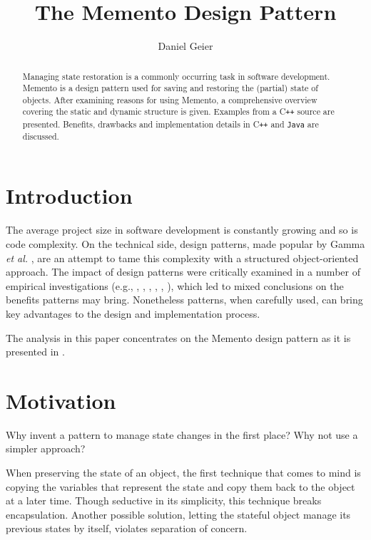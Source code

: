 \documentclass[11pt, a4paper, twoside]{article}
\title{The Memento Design Pattern}
\author{Daniel Geier}
\date{} %
\def\cpp{C{}\texttt{++}}
\begin{document}
	\maketitle

	\begin{abstract} \noindent
 		Managing state restoration is a commonly occurring task in software development. Memento is a design pattern used for saving and restoring the (partial) state of objects. After examining reasons for using Memento, a comprehensive overview covering the static and dynamic structure is given. Examples from a \cpp{} source are presented. Benefits, drawbacks and implementation details in \cpp{} and \verb|Java| are discussed.
	\end{abstract}
	
	\section{Introduction}
	\label{sec:intro}
	The average project size in software development is constantly growing and so is code complexity. On the technical side, design patterns, made popular by Gamma \textit{et al.} \cite{gamma1993design}, are an attempt to tame this complexity with a structured object-oriented approach. The impact of design patterns were critically examined in a number of empirical investigations (e.g., \cite{jeanmart2009impact}, \cite{khomh2008design}, \cite{di2008empirical}, \cite{prechelt2001controlled}, \cite{vokac2004defect}, \cite{vokavc2004controlled}), which led to mixed conclusions on the benefits patterns may bring. Nonetheless patterns, when carefully used, can bring key advantages to the design and implementation process.
	
	The analysis in this paper concentrates on the Memento design pattern as it is presented in \cite{gamma1994design}.
	
	\section{Motivation}
	\label{sec:motivation}
	 Why invent a pattern to manage state changes in the first place? Why not use a simpler approach?
	 
	 When preserving the state of an object, the first technique that comes to mind is copying the variables that represent the state and copy them back to the object at a later time. Though seductive in its simplicity, this technique breaks encapsulation. Another possible solution, letting the stateful object manage its previous states by itself, violates separation of concern.
	 
\end{document}
